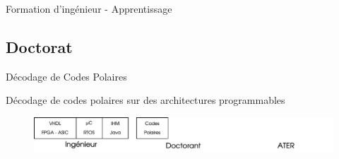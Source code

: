 \documentclass[t,compress,mathserif,12pt,xcolor=dvipsnames]{beamer}
\begin{document}
\begin{frame}[t]{Formation d'ingénieur - Apprentissage}
\begin{figure}[htp]
    \centering
  \end{figure}


\end{frame}

\subsection{Doctorat}
\begin{frame}[t]{Décodage de Codes Polaires}
  \begin{minipage}[t][5.0cm][t]{\textwidth}
  \vspace{1cm}
  \centering
  Décodage de codes polaires sur des architectures programmables

  \end{minipage}
  \begin{figure}[htp]
    \centering
    \includegraphics[width=\textwidth]{fig/frise5}
  \end{figure}
\end{frame}
\end{document}
